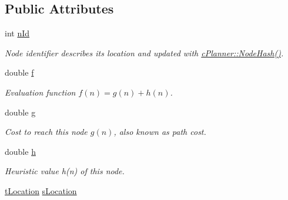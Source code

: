 \subsection*{Public Attributes}
\begin{DoxyCompactItemize}
\item 
\mbox{\label{structplanner_1_1t_node_a066ba40e1ca2ba323116a443528df174}} 
int \mbox{\hyperlink{structplanner_1_1t_node_a066ba40e1ca2ba323116a443528df174}{n\+Id}}
\begin{DoxyCompactList}\small\item\em Node identifier describes its location and updated with \mbox{\hyperlink{classplanner_1_1c_planner_a4c99873ce64b214899d65eda6366455f}{c\+Planner\+::\+Node\+Hash()}}. \end{DoxyCompactList}\item 
\mbox{\label{structplanner_1_1t_node_adc45202105ccc8b7fb040d557977dbd4}} 
double \mbox{\hyperlink{structplanner_1_1t_node_adc45202105ccc8b7fb040d557977dbd4}{f}}
\begin{DoxyCompactList}\small\item\em Evaluation function $f(n) = g(n) + h(n)$. \end{DoxyCompactList}\item 
\mbox{\label{structplanner_1_1t_node_a3b6b0cf6cf79d00aa1725e656246ed47}} 
double \mbox{\hyperlink{structplanner_1_1t_node_a3b6b0cf6cf79d00aa1725e656246ed47}{g}}
\begin{DoxyCompactList}\small\item\em Cost to reach this node $g(n)$, also known as path cost. \end{DoxyCompactList}\item 
\mbox{\label{structplanner_1_1t_node_a7460c082f787b803f0202436edea6526}} 
double \mbox{\hyperlink{structplanner_1_1t_node_a7460c082f787b803f0202436edea6526}{h}}
\begin{DoxyCompactList}\small\item\em Heuristic value h(n) of this node. \end{DoxyCompactList}\item 
\mbox{\label{structplanner_1_1t_node_af13cb3b665f2c03c8b9c764d3fd42b4b}} 
\mbox{\hyperlink{structplanner_1_1t_location}{t\+Location}} \mbox{\hyperlink{structplanner_1_1t_node_af13cb3b665f2c03c8b9c764d3fd42b4b}{s\+Location}}

\end{DoxyCompactItemize}
